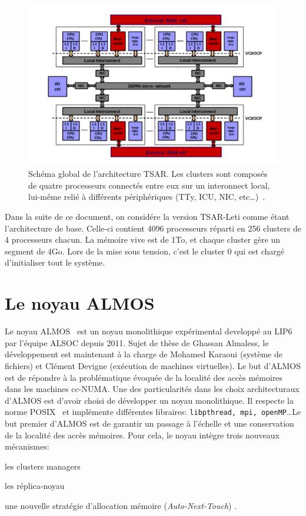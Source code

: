     \begin{figure}[ht]
      \centering \includegraphics[scale=0.2]{include/img/tsar.png}
      \caption{Schéma global de l'architecture TSAR. Les clusters sont composés
        de quatre processeurs connectés entre eux sur un interonnect local,
        lui-même relié à différents périphériques (TTy, ICU, NIC,
        etc\ldots)~\citep{greiner2009tsar}.}
      \label{fig:tsar}
    \end{figure}

    Dans la suite de ce document, on considére la version TSAR-Leti comme étant
    l'architecture de base. Celle-ci contient 4096 processeurs réparti en 256
    clusters de 4 processeurs chacun. La mémoire vive est de 1To, et chaque
    cluster gère un segment de 4Go. Lors de la mise sous tension, c'est le
    cluster 0 qui est chargé d'initialiser tout le système.

  \section{Le noyau ALMOS}
  \label{sec:almos}

    Le noyau ALMOS~\cite{almaless2011almos} est un noyau monolithique
    expérimental developpé au LIP6 par l'équipe ALSOC depuis 2011. Sujet de
    thèse de Ghassan Almaless, le développement est maintenant à la charge de
    Mohamed Karaoui (système de fichiers) et Clément Devigne (exécution de
    machines virtuelles). Le but d'ALMOS est de répondre à la problématique
    évoquée de la localité des accès mémoires dans les machines cc-NUMA. Une des
    particularités dans les choix architecturaux d'ALMOS est d'avoir choisi de
    développer un noyau monolithique. Il respecte la norme
    POSIX~\cite{posix2013} et implémente différentes libraires:
    \texttt{libpthread, mpi, openMP}\ldots Le but premier d'ALMOS est de
    garantir un passage à l'échelle et une conservation de la localité des accès
    mémoires. Pour cela, le noyau intègre trois nouveaux mécanismes:
    \benumline \item les clusters managers \item les réplica-noyau \item une
    nouvelle stratégie d'allocation mémoire (\textit{Auto-Next-Touch})
    \eenumline.


